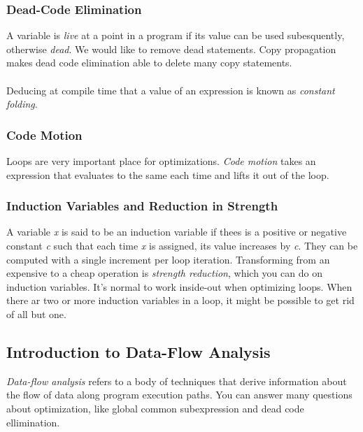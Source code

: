 \documentclass{article}
\begin{document}
\subsubsection{Dead-Code Elimination} %
\label{ssub:Dead-Code Elimination}
A variable is \emph{live} at a point in a program if its value can be used subesquently, otherwise \emph{dead}. We would like to remove dead statements. Copy propagation makes dead code elimination able to delete many copy statements.\\
\\ Deducing at compile time that a value of an expression is known as \emph{constant folding}.

\subsubsection{Code Motion} %
\label{ssub:Code Motion}
Loops are very important place for optimizations. \emph{Code motion} takes an expression that evaluates to the same each time and lifts it out of the loop.

\subsubsection{Induction Variables and Reduction in Strength} %
\label{ssub:Induction Variables and Reduction in Strength}
A variable \emph{x} is said to be an induction variable if thees is a positive or negative constant \emph{c} such that each time \emph{x} is assigned, its value increases by \emph{c}. They can be computed with a single increment per loop iteration. Transforming from an expensive to a cheap operation is \emph{strength reduction}, which you can do on induction variables. It's normal to work inside-out when optimizing loops. When there ar two or more induction variables in a loop, it might be possible to get rid of all but one.

\subsection{Introduction to Data-Flow Analysis} %
\label{sub:Introduction to Data-Flow Analysis}
\emph{Data-flow analysis} refers to a body of techniques that derive information about the flow of data along program execution paths. You can answer many questions about optimization, like global common subexpression and dead code ellimination.
\end{document}
